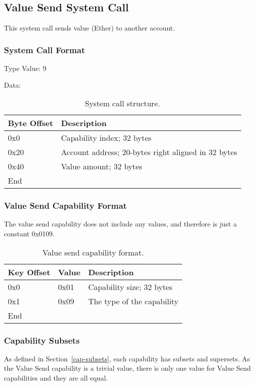 \documentclass[english,a4paper]{article}
\let\oldparagraph\subsubsection
\renewcommand{\subsubsection}[1]{\oldparagraph{#1}\mbox{}}
\begin{document}
\subsection{Value Send System Call}
This system call sends value (Ether) to another account.

\subsubsection{System Call Format}
Type Value: 9

Data:

\begin{table}[H]
  \caption{System call structure.}
  \centering{}%
  \begin{tabular}{l|p{}}
    \hline
    Byte Offset & Description\tabularnewline
    \hline
    \hline
    0x0 & Capability index; 32 bytes \tabularnewline
    0x20 & Account address; 20-bytes right aligned in 32 bytes \tabularnewline
    0x40 & Value amount; 32 bytes \tabularnewline
    \hline
    End &  \tabularnewline
    \hline
  \end{tabular}
\end{table}

\subsubsection{Value Send Capability Format}
The value send capability does not include any values, and therefore is just a
constant 0x0109.

\begin{table}[H]
  \caption{Value send capability format.}
  \centering{}%
  \begin{tabular}{l|l|p{}}
    \hline
    Key Offset & Value & Description\tabularnewline
    \hline
    \hline
    0x0 & 0x01 & Capability size; 32 bytes \tabularnewline
    0x1 & 0x09 & The type of the capability \tabularnewline
    \hline
    End &  \tabularnewline
    \hline
  \end{tabular}
\end{table}

\subsubsection{Capability Subsets}
As defined in Section~\ref{cap-subsets}, each capability has subsets and
supersets. As the Value Send capability is a trivial value, there is only one
value for Value Send capabilities and they are all equal.
\end{document}
